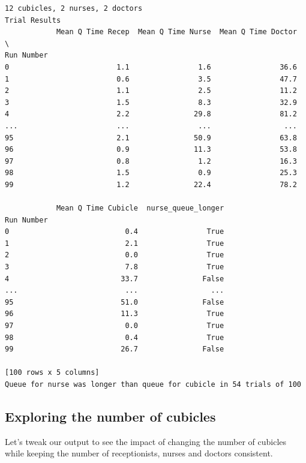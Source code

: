 \documentclass[
  letterpaper,
  DIV=11,
  numbers=noendperiod]{scrreprt}
\begin{document}
\begin{verbatim}
12 cubicles, 2 nurses, 2 doctors
Trial Results
            Mean Q Time Recep  Mean Q Time Nurse  Mean Q Time Doctor  \
Run Number                                                             
0                         1.1                1.6                36.6   
1                         0.6                3.5                47.7   
2                         1.1                2.5                11.2   
3                         1.5                8.3                32.9   
4                         2.2               29.8                81.2   
...                       ...                ...                 ...   
95                        2.1               50.9                63.8   
96                        0.9               11.3                53.8   
97                        0.8                1.2                16.3   
98                        1.5                0.9                25.3   
99                        1.2               22.4                78.2   

            Mean Q Time Cubicle  nurse_queue_longer  
Run Number                                           
0                           0.4                True  
1                           2.1                True  
2                           0.0                True  
3                           7.8                True  
4                          33.7               False  
...                         ...                 ...  
95                         51.0               False  
96                         11.3                True  
97                          0.0                True  
98                          0.4                True  
99                         26.7               False  

[100 rows x 5 columns]
Queue for nurse was longer than queue for cubicle in 54 trials of 100
\end{verbatim}

\subsection{Exploring the number of
cubicles}\label{exploring-the-number-of-cubicles}

Let's tweak our output to see the impact of changing the number of
cubicles while keeping the number of receptionists, nurses and doctors
consistent.
\end{document}
